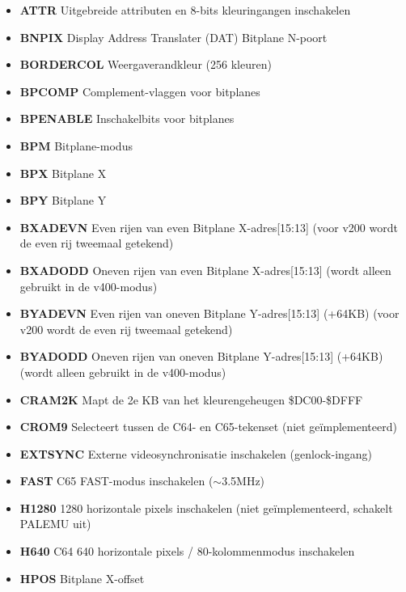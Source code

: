 \begin{itemize}
\item{\bf{ATTR}} Uitgebreide attributen en 8-bits kleuringangen inschakelen
\item{\bf{BNPIX}} Display Address Translater (DAT) Bitplane N-poort
\item{\bf{BORDERCOL}} Weergaverandkleur (256 kleuren)
\item{\bf{BPCOMP}} Complement-vlaggen voor bitplanes
\item{\bf{BPENABLE}} Inschakelbits voor bitplanes
\item{\bf{BPM}} Bitplane-modus
\item{\bf{BPX}} Bitplane X
\item{\bf{BPY}} Bitplane Y
\item{\bf{BXADEVN}} Even rijen van even Bitplane X-adres[15:13] (voor v200 wordt de even rij tweemaal getekend)
\item{\bf{BXADODD}} Oneven rijen van even Bitplane X-adres[15:13] (wordt alleen gebruikt in de v400-modus)
\item{\bf{BYADEVN}} Even rijen van oneven Bitplane Y-adres[15:13] (+64KB) (voor v200 wordt de even rij tweemaal getekend)
\item{\bf{BYADODD}} Oneven rijen van oneven Bitplane Y-adres[15:13] (+64KB) (wordt alleen gebruikt in de v400-modus)
\item{\bf{CRAM2K}} Mapt de 2e KB van het kleurengeheugen \@ \$DC00-\$DFFF
\item{\bf{CROM9}} Selecteert tussen de C64- en C65-tekenset (niet geïmplementeerd)
\item{\bf{EXTSYNC}} Externe videosynchronisatie inschakelen (genlock-ingang)
\item{\bf{FAST}} C65 FAST-modus inschakelen ($\sim$3.5MHz)
\item{\bf{H1280}} 1280 horizontale pixels inschakelen (niet geïmplementeerd, schakelt PALEMU uit)
\item{\bf{H640}} C64 640 horizontale pixels / 80-kolommenmodus inschakelen
\item{\bf{HPOS}} Bitplane X-offset

\end{itemize}
